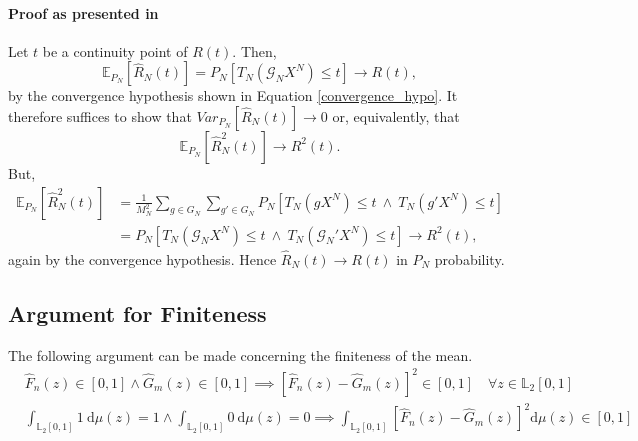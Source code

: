 \documentclass[12pt, a4paper]{article}
\theoremstyle{MAstyle} \newtheorem{assumption}{Assumption}[section]
\theoremstyle{MAstyle} \newtheorem{definition}{Definition}[section]
\theoremstyle{MAstyle} \newtheorem{theorem}{Theorem}[section]
\begin{document}
			\paragraph{Proof as presented in \cite{lehmann_testing_2005}\\}
			Let $t$ be a continuity point of $R(t)$. Then, 
			\begin{equation}
				\mathbb{E}_{P_N}\left[\hat{R}_N(t)\right] = P_N\left[T_N(\mathcal{G}_NX^N) \leq t\right] \rightarrow R(t),
			\end{equation}
			by the convergence hypothesis shown in Equation \ref{convergence_hypo}. It therefore suffices to show that $\textit{Var}_{P_N}\left[\hat{R}_N(t)\right] \rightarrow 0$ or, equivalently, that
			\begin{equation}
				\mathbb{E}_{P_N}\left[\hat{R}_N^2(t)\right] \rightarrow R^2(t).
			\end{equation}
			But, 
			\begin{equation}
				\begin{split}
					\mathbb{E}_{P_N}\left[\hat{R}_N^2(t)\right] &= \frac{1}{M_N^2}\sum_{g \in G_N}\sum_{g' \in G_N} P_N\left[T_N(gX^N) \leq t \ \land \ T_N(g'X^N) \leq t\right] \\
					&= P_N\left[T_N(\mathcal{G}_NX^N) \leq t \ \land \ T_N(\mathcal{G}_N'X^N) \leq t\right] \rightarrow R^2(t),
				\end{split}
			\end{equation}
			again by the convergence hypothesis. Hence $\hat{R}_N(t) \rightarrow R(t)$ in $P_N$ probability.
			
		\subsection{Argument for Finiteness}\label{finiteness}
		The following argument can be made concerning the finiteness of the mean.
		\begin{equation}
			\begin{split}
				& \hat{F}_n(z) \in [0,1] 	\land \hat{G}_m(z) \in [0,1] \implies \left[\hat{F}_n(z) - \hat{G}_m(z)\right]^2 \in [0,1] \quad \forall z \in \mathbb{L}_2[0,1]\\
				& \int_{\mathbb{L}_2[0,1]} 1 \ \mathrm{d}\mu(z) = 1 \land \int_{\mathbb{L}_2[0,1]} 0 \ \mathrm{d}\mu(z) = 0 \implies \int_{\mathbb{L}_2[0,1]}\left[\hat{F}_n(z) - \hat{G}_m(z)\right]^2 \mathrm{d}\mu(z) \in [0,1]
			\end{split}
		\end{equation}			 
	
\end{document}

